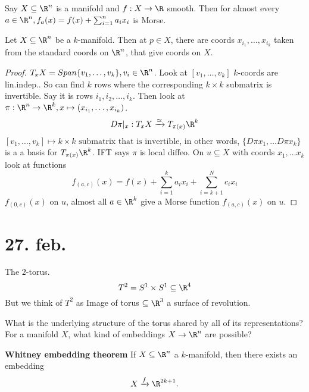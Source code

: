 \begin{theorem}
  Say $X \subseteq \R^n$ is a manifold and $f: X \to \R$ smooth. Then for almost every $a \in \R^n, f_a(x)=f(x)+\sum_{i=1}^{n}a_ix_i$ is Morse.
\end{theorem}
\begin{lemma}
  Let $X \subseteq \R^n $ be a $k$-manifold. Then at $p\in X$, there are coords $x_{i_1}, \dots , x_{i_k}$ taken from the standard coords on $\R^n$, that give coords on $X$.
\end{lemma}
\begin{proof}
  $T_xX=Span\{v_1,\dots , v_k\}, v_i\in \R^n$. Look at $[v_1, \dots , v_k]$ $k$-coords are lin.indep.. So can find $k$ rows where the corresponding $k\times k$ submatrix is invertible. Say it is rows $i_1, i_2, \dots , i_k$. Then look at $\pi: \R^n \to \R^k, x\mapsto (x_{i_1}, \dots , x_{i_k})$.
  $$D\pi \rvert_x : T_xX \xrightarrow{\simeq}T_{\pi(x)}\R^k$$
  $[v_1,\dots,v_k] \mapsto k\times k\text{ submatrix that is invertible}$, in other words, $\{D\pi x_1, \dots D\pi x_k\}$ is a a basis for $T_{\pi(x)}\R^k$. IFT says $\pi$ is local diffeo.
  \newline On $u \subseteq X$ with coords $x_1, \dots x_k$ look at functions
    $$f_{(a,c)}(x)=f(x)+\sum_{i=1}^ka_ix_i+\sum_{i=k+1}^Nc_ix_i$$
    $f_{(0,c)}(x)$ on $u$, almost all $a\in \R^k$ give a Morse function $f_{(a,c)}(x)$ on $u$.
\end{proof}

\section{27. feb.}
\begin{remark}
  The $2$-torus.
    $$T^2= S^1 \times S^1 \subseteq \R^4$$
  But we think of $T^2$ as
    \newline Image of torus $\subseteq \R^3$
    \newline a surface of revolution.
\end{remark}
What is the underlying structure of the torus shared by all of its representations?
\newline For a manifold $X$, what kind of embeddings $X\to \R^n$ are possible?

\begin{theorem}
  \textbf{Whitney embedding theorem}
  \newline If $X \subseteq \R^n $ a $k$-manifold, then there exists an embedding
    $$X \xrightarrow{f} \R^{2k+1}.$$
\end{theorem}
